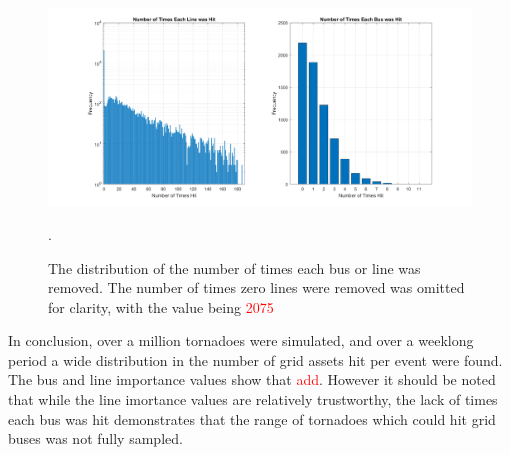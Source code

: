 \documentclass[12pt]{article}
\begin{document}
\begin{figure}[H]
    \centering %
    \includegraphics[width=\textwidth]{Timeseachitemhit.png}
    \caption[Distribution of the number of times each bus or line was removed]{The distribution of the number of times each bus or line was removed. The number of times zero lines were removed was omitted for clarity, with the value being \textcolor{red}{2075}}.
    \label{fig:Timeseachitemhit}
\end{figure}

In conclusion, over a million tornadoes were simulated, and over a weeklong period a wide distribution in the number of grid assets hit per event were found. The bus and line importance values show that \textcolor{red}{add}. However it should be noted that while the line imortance values are relatively trustworthy, the lack of times each bus was hit demonstrates that the range of tornadoes which could hit grid buses was not fully sampled. 


\newpage
\end{document}
